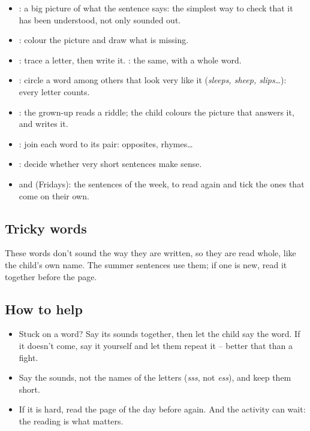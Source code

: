 {\small
\begin{itemize}[leftmargin=6mm, itemsep=1pt, topsep=2pt]
\item \textbf{\lblColorea}: a big picture of what the sentence says:
  the simplest way to check that it has been understood, not only
  sounded out.
\item \textbf{\lblCompleta}: colour the picture and draw what is missing.
\item \textbf{\lblTraza}: trace a letter, then write it.
  \textbf{\lblEscribe}: the same, with a whole word.
\item \textbf{\lblEncuentra}: circle a word among others that look very
  like it (\textit{sleeps, sheep, slips}\ldots): every letter counts.
\item \textbf{\lblAdivina}: the grown-up reads a riddle; the child
  colours the picture that answers it, and writes it.
\item \textbf{\lblUne}: join each word to its pair: opposites,
  rhymes\ldots
\item \textbf{\lblSiNo}: decide whether very short sentences make sense.
\item \textbf{\lblRelee} and \textbf{\lblRepasa} (Fridays): the sentences
  of the week, to read again and tick the ones that come on their own.
\end{itemize}}

\subsection*{Tricky words}

{\small These words don't sound the way they are written, so they are
read whole, like the child's own name. The summer sentences use them; if
one is new, read it together before the page.\par}
\vspace{2mm}
{\raggedright\par}

\subsection*{How to help}

{\small
\begin{itemize}[leftmargin=6mm, itemsep=1pt, topsep=2pt]
\item Stuck on a word? Say its sounds together, then let the child say
  the word. If it doesn't come, say it yourself and let them repeat it
  -- better that than a fight.
\item Say the sounds, not the names of the letters (\textit{sss}, not
  \textit{ess}), and keep them short.
\item If it is hard, read the page of the day before again. And the
  activity can wait: the reading is what matters.
\end{itemize}}
\newpage
